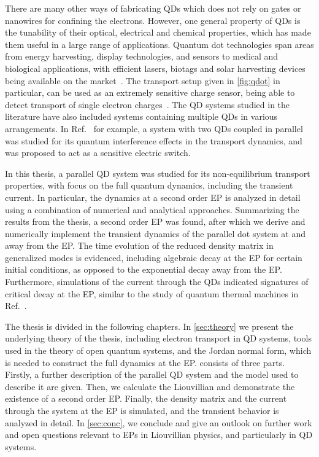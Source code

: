 \documentclass[../main.tex]{subfiles}
\begin{document}
There are many other ways of fabricating QDs which does not rely on gates or nanowires for confining the electrons. However, one general property of QDs is the tunability of their optical, electrical and chemical properties, which has made them useful in a large range of applications. Quantum dot technologies span areas from energy harvesting, display technologies, and sensors to medical and biological applications, with efficient lasers, biotags and solar harvesting devices being available on the market~\cite{qdotrev}. The transport setup given in \cref{fig:qdot} in particular, can be used as an extremely sensitive charge sensor, being able to detect transport of single electron charges~\cite{etrans}. The QD systems studied in the literature have also included systems containing multiple QDs in various arrangements. In Ref.~\cite{doubledot} for example, a system with two QDs coupled in parallel was studied for its quantum interference effects in the transport dynamics, and was proposed to act as a sensitive electric switch.

In this thesis, a parallel QD system was studied for its non-equilibrium transport properties, with focus on the full quantum dynamics, including the transient current. In particular, the dynamics at a second order EP is analyzed in detail using a combination of numerical and analytical approaches. Summarizing the results from the thesis, a second order EP was found, after which we derive and numerically implement the transient dynamics of the parallel dot system at and away from the EP. The time evolution of the reduced density matrix in generalized modes is evidenced, including algebraic decay at the EP for certain initial conditions, as opposed to the exponential decay away from the EP. Furthermore, simulations of the current through the QDs indicated signatures of critical decay at the EP, similar to the study of quantum thermal machines in Ref.~\cite{thermal}.



The thesis is divided in the following chapters. In \cref{sec:theory} we present the underlying theory of the thesis, including electron transport in QD systems, tools used in the theory of open quantum systems, and the Jordan normal form, which is needed to construct the full dynamics at the EP.  consists of three parts. Firstly, a further description of the parallel QD system and the model used to describe it are given. Then, we calculate the Liouvillian and demonstrate the existence of a second order EP. Finally, the density matrix and the current through the system at the EP is simulated, and the transient behavior is analyzed in detail. In \cref{sec:conc}, we conclude and give an outlook on further work and open questions relevant to EPs in Liouvillian physics, and particularly in QD systems.
\end{document}
